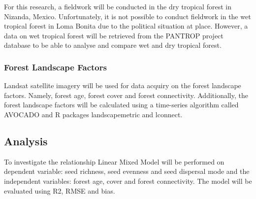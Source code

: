 For this research, a fieldwork will be conducted in the dry tropical forest in Nizanda, Mexico. 
Unfortunately, it is not possible to conduct fieldwork in the wet tropical forest in Loma Bonita due to the political situation at place. However, a data on wet tropical forest will be retrieved from the PANTROP project database to be able to analyse and compare wet and dry tropical forest.

\subsubsection{Forest Landscape Factors}
Landsat satellite imagery will be used for data acquiry on the forest landscape factors. Namely, forest age, forest cover and forest connectivity. Additionally, the forest landscape factors will be calculated using a time-series algorithm called AVOCADO and R packages landscapemetric and lconnect.

\subsection{Analysis}
To investigate the relationship Linear Mixed Model will be performed on dependent variable: seed richness, seed evenness and seed dispersal mode and the independent variables: forest age, cover and forest connectivity. The model will be evaluated using R2, RMSE and bias.


 